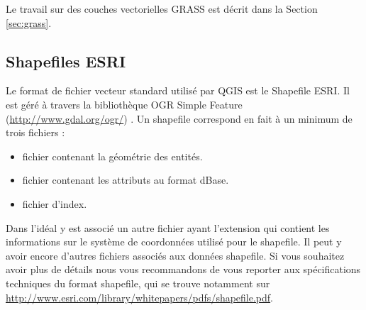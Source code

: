 Le travail sur des couches vectorielles GRASS est d\'ecrit dans la Section \ref{sec:grass}.

\subsection{Shapefiles ESRI}

Le format de fichier vecteur standard utilis\'e par QGIS est le Shapefile ESRI. Il est g\'er\'e \`a travers la biblioth\`eque OGR Simple Feature  (\url{http://www.gdal.org/ogr/}) . Un shapefile correspond en fait \`a un minimum de trois fichiers : 

\begin{itemize}
\item {} fichier contenant la g\'eom\'etrie des entit\'es.
\item {} fichier contenant les attributs au format dBase.
\item {} fichier d'index.
\end{itemize}

Dans l'id\'eal y est associ\'e un autre fichier ayant l'extension  qui contient les informations sur le syst\`eme de coordonn\'ees utilis\'e pour le shapefile. Il peut y avoir encore d'autres fichiers associ\'es aux donn\'ees shapefile. Si vous souhaitez avoir plus de d\'etails nous vous recommandons de vous reporter aux sp\'ecifications techniques du format shapefile, qui se trouve notamment sur \url{http://www.esri.com/library/whitepapers/pdfs/shapefile.pdf}.

